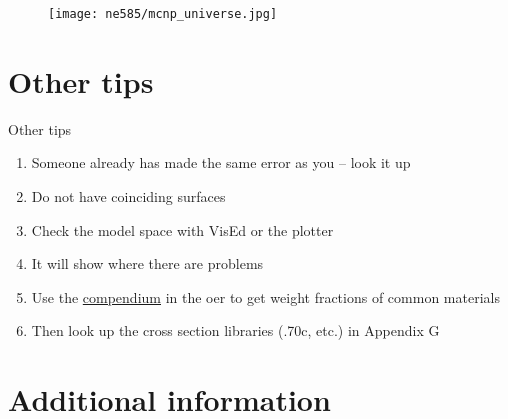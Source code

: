 \documentclass[aspectratio=1610,pdftex,dvipsnames,compress,xcolor={dvipsnames}]{beamer}
\newcommand{\acs}{\acrshort} %
\begin{document}
\begin{frame}{}
    \begin{figure}
        \centering
        \texttt{[image: ne585/mcnp\_universe.jpg]}
    \end{figure}
\end{frame}


\section{Other tips}


\addtocounter{framenumber}{-1} 
\begin{frame}{Other tips}
    \begin{enumerate}[series=outerlist,topsep=0pt,itemsep=21pt,leftmargin=*,label=(\arabic*)]
        \item[]Someone already has made the same error as you -- look it up
        \item[]Do not have coinciding surfaces
        \item[]Check the model space with VisEd or the plotter
        \item[]It will show where there are problems
        \item[]Use the \href{https://uidaho.pressbooks.pub/nuclearengineering/chapter/mcnp/}{compendium} in the \acs{oer} to get weight fractions of common materials
        \item[]Then look up the cross section libraries (.70c, etc.) in Appendix G
    \end{enumerate}
\end{frame}


\section{Additional information}
\end{document}
